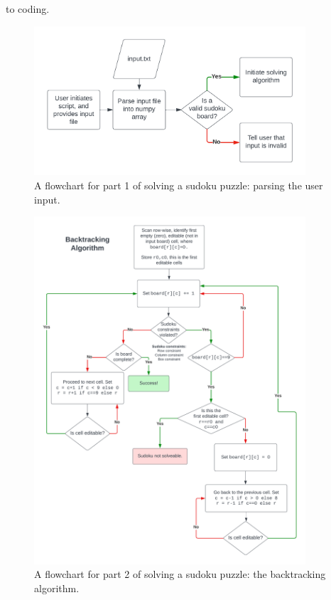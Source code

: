     to coding.
    \begin{figure}[htb]
    \centering
    \includegraphics[width=0.9\textwidth]{./figures/parse-input-prototype}
    \caption{A flowchart for part 1 of solving a sudoku puzzle: parsing the user input.}
    \label{fig:input-prototype}
    \end{figure}

    \begin{figure}[htb]
    \centering
    \includegraphics[width=0.9\textwidth]{./figures/backtracking-prototype}
    \caption{A flowchart for part 2 of solving a sudoku puzzle: the backtracking algorithm.}
    \label{fig:backtracking-prototype}
    \end{figure}

